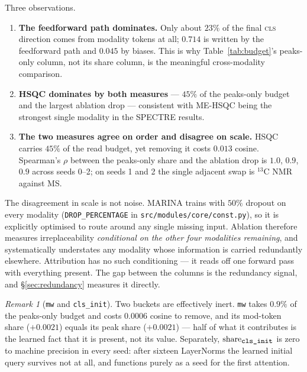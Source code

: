 \documentclass[11pt]{article}
\theoremstyle{plain}
\theoremstyle{remark}
\newtheorem*{remark}{Remark}
\newcommand{\code}[1]{\texttt{\small #1}}
\begin{document}
Three observations.

\begin{enumerate}
  \item \textbf{The feedforward path dominates.} Only about $23\%$ of the final
        \textsc{cls} direction comes from modality tokens at all;
        $0.714$ is written by the feedforward path and $0.045$ by biases. This
        is why Table~\ref{tab:budget}'s peaks-only column, not its share
        column, is the meaningful cross-modality comparison.
  \item \textbf{HSQC dominates by both measures} --- $45\%$ of the peaks-only
        budget and the largest ablation drop --- consistent with ME-HSQC being
        the strongest single modality in the SPECTRE results.
  \item \textbf{The two measures agree on order and disagree on scale.} HSQC
        carries $45\%$ of the read budget, yet removing it costs $0.013$
        cosine. Spearman's $\rho$ between the peaks-only share and the ablation
        drop is $1.0$, $0.9$, $0.9$ across seeds 0--2; on seeds 1 and 2 the
        single adjacent swap is $^{13}$C NMR against MS.
\end{enumerate}

\noindent
The disagreement in scale is not noise. MARINA trains with $50\%$ dropout on
every modality (\code{DROP\_PERCENTAGE} in \code{src/modules/core/const.py}),
so it is explicitly optimised to route around any single missing input.
Ablation therefore measures irreplaceability \emph{conditional on the other
four modalities remaining}, and systematically understates any modality whose
information is carried redundantly elsewhere. Attribution has no such
conditioning --- it reads off one forward pass with everything present. The gap
between the columns is the redundancy signal, and \S\ref{sec:redundancy}
measures it directly.

\begin{remark}[\code{mw} and \code{cls\_init}]
Two buckets are effectively inert. \code{mw} takes $0.9\%$ of the peaks-only
budget and costs $0.0006$ cosine to remove, and its mod-token share ($+0.0021$)
equals its peak share ($+0.0021$) --- half of what it contributes is the
learned fact that it is present, not its value. Separately,
$\text{share}_{\code{cls\_init}}$ is zero to machine precision in every seed:
after sixteen LayerNorms the learned initial query survives not at all, and
functions purely as a seed for the first attention.
\end{remark}
\end{document}
